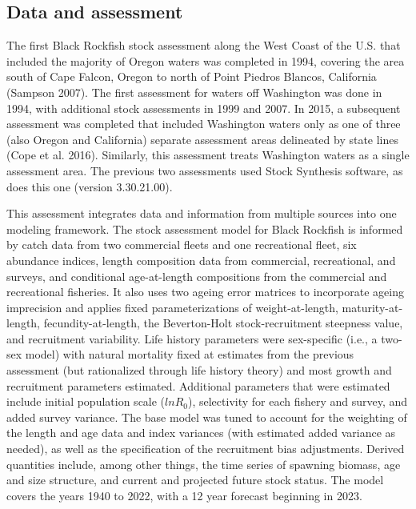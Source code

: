 \documentclass[11pt,
  english,
  letterpaper,
]{article}
\begin{document}
\hypertarget{data-and-assessment}{%
\subsection*{Data and assessment}\label{data-and-assessment}}

The first Black Rockfish stock assessment along the West Coast of the U.S. that included the majority of Oregon waters was completed in 1994, covering the area south of Cape Falcon, Oregon to north of Point Piedros Blancos, California (Sampson 2007). The first assessment for waters off Washington was done in 1994, with additional stock assessments in 1999 and 2007. In 2015, a subsequent assessment was completed that included Washington waters only as one of three (also Oregon and California) separate assessment areas delineated by state lines (Cope et al. 2016). Similarly, this assessment treats Washington waters as a single assessment area. The previous two assessments used Stock Synthesis software, as does this one (version 3.30.21.00).

This assessment integrates data and information from multiple sources into one modeling framework. The stock assessment model for Black Rockfish is informed by catch data from two commercial fleets and one recreational fleet, six abundance indices, length composition data from commercial, recreational, and surveys, and conditional age-at-length compositions from the commercial and recreational fisheries. It also uses two ageing error matrices to incorporate ageing imprecision and applies fixed parameterizations of weight-at-length, maturity-at-length, fecundity-at-length, the Beverton-Holt stock-recruitment steepness value, and recruitment variability. Life history parameters were sex-specific (i.e., a two-sex model) with natural mortality fixed at estimates from the previous assessment (but rationalized through life history theory) and most growth and recruitment parameters estimated. Additional parameters that were estimated include initial population scale (\(lnR_0\)), selectivity for each fishery and survey, and added survey variance. The base model was tuned to account for the weighting of the length and age data and index variances (with estimated added variance as needed), as well as the specification of the recruitment bias adjustments. Derived quantities include, among other things, the time series of spawning biomass, age and size structure, and current and projected future stock status. The model covers the years 1940 to 2022, with a 12 year forecast beginning in 2023.
\end{document}
